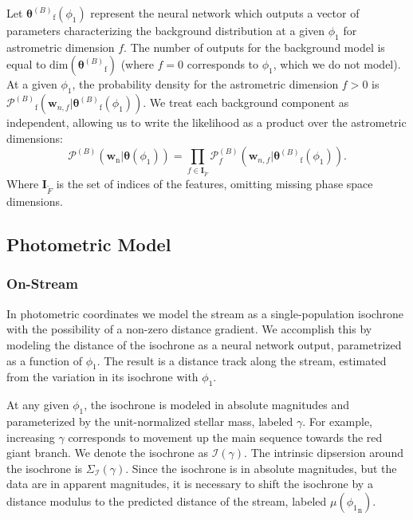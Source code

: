 \documentclass[twocolumn]{aastex631}
\newcommand{\mrm}[1]{\mathrm{#1}}
\newcommand{\mbs}[1]{\boldsymbol{#1}}
\newcommand{\mcal}[1]{\mathcal{#1}}
\newcommand{\pdf}{\mcal{P}}
\newcommand{\nth}[1]{{#1}_{\mrm{n}}}  %
\newcommand{\fth}[1]{{#1}_{\mrm{f}}}  %
\newcommand{\cmp}[2]{#2^{(#1)}}
\begin{document}
            Let $\fth{\cmp{B}{\mbs{\theta}}}(\phi_1)$ represent the neural network which outputs a vector of parameters characterizing the background distribution at a given $\phi_1$ for astrometric dimension $f$. The number of outputs for the background model is equal to $\mathrm{dim}\left(\fth{\cmp{B}{\mbs{\theta}}}\right)$ (where $f=0$ corresponds to $\phi_1$, which we do not model). At a given $\phi_1$, the probability density for the astrometric dimension $f>0$ is $\fth{\pdf^{(B)}}\left(\mbs{w}_{n,f} | \fth{\cmp{B}{\mbs{\theta}}}(\phi_1) \right)$. We treat each background component as independent, allowing us to write the likelihood as a product over the astrometric dimensions:
            \begin{equation} \label{eq:astrometric_model_off_stream_probability}
                \pdf^{(B)}\left(\nth{\mbs{w}} | \mbs{\theta}(\phi_1) \right) = \prod_{f\in \mbs{I}_{\tilde{F}}} \pdf_f^{(B)}\left(\mbs{w}_{n,f} | \fth{\cmp{B}{\mbs{\theta}}}(\phi_1) \right).
            \end{equation}
            Where $\mbs{I}_{\tilde{F}}$ is the set of indices of the features, omitting missing phase space dimensions.
        

    \subsection{Photometric Model} \label{sub:photometric_model}

        \subsubsection{On-Stream} \label{sub:photometric_model_on_stream}
            In photometric coordinates we model the stream as a single-population isochrone with the possibility of a non-zero distance gradient. We accomplish this by modeling the distance of the isochrone as a neural network output, parametrized as a function of $\phi_1$. The result is a distance track along the stream, estimated from the variation in its isochrone with $\phi_1$. 
            
            At any given $\phi_1$, the isochrone is modeled in absolute magnitudes
            and parameterized by the unit-normalized stellar mass, labeled $\gamma$. For example, increasing $\gamma$ corresponds to movement up the main sequence towards the red giant branch. We denote the isochrone as $\mcal{I(\gamma)}$. The intrinsic dipsersion around the isochrone is $\Sigma_\mcal{I}(\gamma)$. Since the isochrone is in absolute magnitudes, but the data are in apparent magnitudes,
            it is necessary to shift the isochrone by a distance modulus to the predicted distance of the stream, labeled  $\mu(\nth{\phi_1})$.
            
\end{document}
